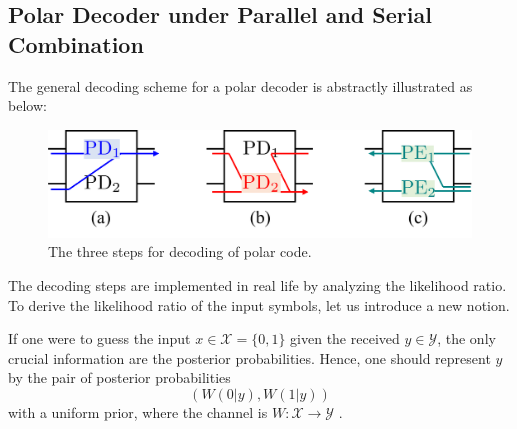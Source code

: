\subsection{Polar Decoder under Parallel and Serial Combination} \label{sec:w5_polar_dec_par_ser}
The general decoding scheme for a polar decoder is abstractly illustrated as below:
\begin{figure}[H]
    \centering
    \includegraphics[width=0.6\linewidth]{figures/w5_dec_scheme.png}
    \caption{The three steps for decoding of polar code.}
\end{figure}
The decoding steps are implemented in real life by analyzing the likelihood ratio. To derive the likelihood ratio of the input symbols, let us introduce a new notion.
\begin{definition}
    If one were to guess the input $x\in\mathcal{X}=\{0,1\}$ given the received $y\in\mathcal{Y}$, the only crucial information are the posterior probabilities. Hence, one should represent $y$ by the pair of posterior probabilities
    \begin{equation}
        \left(W(0\vert y), W(1\vert y)\right)
    \end{equation}
    with a uniform prior, where the channel is $W:\mathcal{X}\rightarrow\mathcal{Y}$ .
\end{definition}

